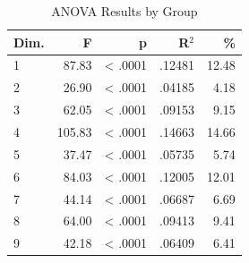 \begin{table}[H]
  \centering
  \caption{ANOVA Results by Group}
  \label{tab:anova_group}
  \begin{tabular}{l r r r r}
    Dim. & F & p & R$^2$ & \% \\
    \hline
    1 & 87.83 & < .0001 & .12481 & 12.48 \\
    2 & 26.90 & < .0001 & .04185 & 4.18 \\
    3 & 62.05 & < .0001 & .09153 & 9.15 \\
    4 & 105.83 & < .0001 & .14663 & 14.66 \\
    5 & 37.47 & < .0001 & .05735 & 5.74 \\
    6 & 84.03 & < .0001 & .12005 & 12.01 \\
    7 & 44.14 & < .0001 & .06687 & 6.69 \\
    8 & 64.00 & < .0001 & .09413 & 9.41 \\
    9 & 42.18 & < .0001 & .06409 & 6.41 \\
  \end{tabular}
\end{table}
